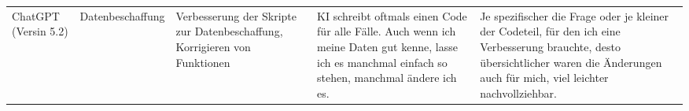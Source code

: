 \documentclass[../main.tex]{subfiles}
\begin{document}
\begin{appendices}
\begin{tiny}
\begin{longtable}{p{}|p{}|p{}|p{}|p{}}
            ChatGPT (Versin 5.2)                         & Datenbeschaffung             & Verbesserung der Skripte zur Datenbeschaffung, Korrigieren von Funktionen                                                                          & KI schreibt oftmals einen Code für alle Fälle. Auch wenn ich meine Daten gut kenne, lasse ich es manchmal einfach so stehen, manchmal ändere ich es. & Je spezifischer die Frage oder je kleiner der Codeteil, für den ich eine Verbesserung brauchte, desto übersichtlicher waren die Änderungen auch für mich, viel leichter nachvollziehbar.                                                                                            \\
        \end{longtable}
    \end{tiny}

\end{appendices}
\end{document}
